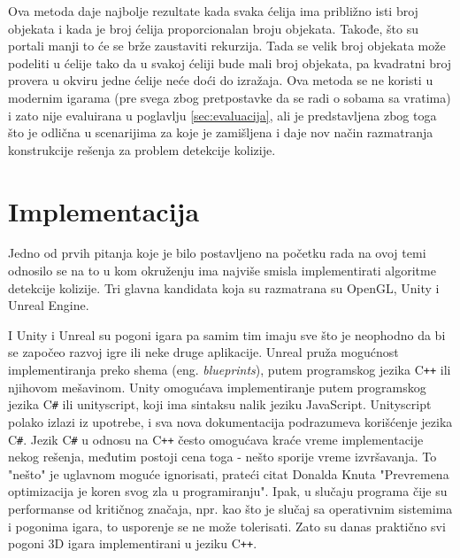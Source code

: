 \documentclass[12pt,oneside]{memoir}
\begin{document}
Ova metoda daje najbolje rezultate kada svaka ćelija ima približno isti broj objekata i kada je 
broj ćelija proporcionalan broju objekata.
Takođe, što su portali manji to će se brže zaustaviti rekurzija.
Tada se velik broj objekata može podeliti u ćelije tako da u svakoj ćeliji bude mali broj objekata,
pa kvadratni broj provera u okviru jedne ćelije neće doći do izražaja.
Ova metoda se ne koristi u modernim igarama (pre svega zbog pretpostavke da se radi o sobama sa vratima) i zato nije evaluirana u poglavlju \ref{sec:evaluacija},
ali je predstavljena zbog toga što je odlična u scenarijima za
koje je zamišljena i daje nov način razmatranja konstrukcije rešenja za problem detekcije kolizije.

\chapter{Implementacija}
\label{sec:implementacija}

Jedno od prvih pitanja koje je bilo postavljeno na početku rada na ovoj temi odnosilo se na to 
u kom okruženju ima najviše smisla implementirati algoritme detekcije kolizije.
Tri glavna kandidata koja su razmatrana su OpenGL, Unity i Unreal Engine.

I Unity i Unreal su pogoni igara pa samim tim imaju sve što je neophodno da 
bi se započeo razvoj igre ili neke druge aplikacije.
Unreal pruža mogućnost implementiranja preko shema (eng. {\em blueprints}),
putem programskog jezika C\texttt{++} ili njihovom mešavinom.
Unity omogućava implementiranje putem programskog jezika C\texttt{\#} ili unityscript,
koji ima sintaksu nalik jeziku JavaScript. Unityscript polako izlazi iz upotrebe, i 
sva nova dokumentacija podrazumeva korišćenje jezika C\texttt{\#}.
Jezik C\texttt{\#} u odnosu na C\texttt{++} često omogućava kraće vreme implementacije nekog rešenja,
međutim postoji cena toga - nešto sporije vreme izvršavanja.
To "nešto" je uglavnom moguće ignorisati, prateći citat Donalda Knuta 
"Prevremena optimizacija je koren svog zla u programiranju".
Ipak, u slučaju programa čije su performanse od kritičnog značaja, npr. kao što je 
slučaj sa operativnim sistemima i pogonima igara, to usporenje se ne može tolerisati.
Zato su danas praktično svi pogoni 3D igara implementirani u jeziku C\texttt{++}.
\end{document}
